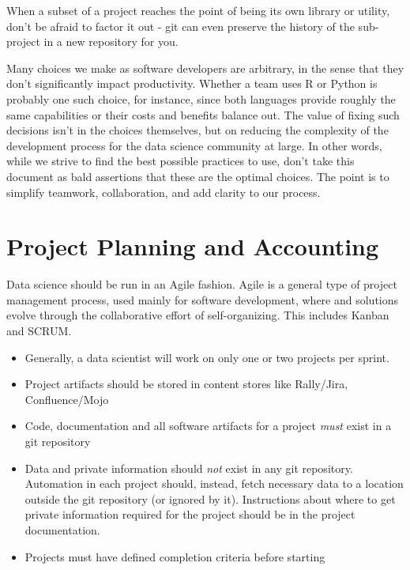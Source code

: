 \documentclass[
  11pt,
]{book}
\providecommand{\tightlist}{%
  \setlength{\itemsep}{0pt}\setlength{\parskip}{0pt}}
\begin{document}
When a subset of a project reaches the point of being its own library or utility, don't be afraid to factor it out - git can even preserve the history of the sub-project in a new repository for you.

Many choices we make as software developers are arbitrary, in the sense that they don't significantly impact productivity. Whether a team uses R or Python is probably one such choice, for instance, since both languages provide roughly the same capabilities or their costs and benefits balance out. The value of fixing such decisions isn't in the choices themselves, but on reducing the complexity of the development process for the data science community at large. In other words, while we strive to find the best possible practices to use, don't take this document as bald assertions that these are the optimal choices. The point is to simplify teamwork, collaboration, and add clarity to our process.

\hypertarget{project-planning-and-accounting}{%
\chapter{Project Planning and Accounting}\label{project-planning-and-accounting}}

Data science should be run in an Agile fashion. Agile is a general type of project management process, used mainly for software development, where and solutions evolve through the collaborative effort of self-organizing. This includes Kanban and SCRUM.

\begin{itemize}
\tightlist
\item
  Generally, a data scientist will work on only one or two projects per sprint.
\item
  Project artifacts should be stored in content stores like Rally/Jira, Confluence/Mojo
\item
  Code, documentation and all software artifacts for a project \emph{must} exist in a git repository
\item
  Data and private information should \emph{not} exist in any git repository. Automation in each project should, instead, fetch necessary data to a location outside the git repository (or ignored by it). Instructions about where to get private information required for the project should be in the project documentation.
\item
  Projects must have defined completion criteria before starting
\end{itemize}
\end{document}
